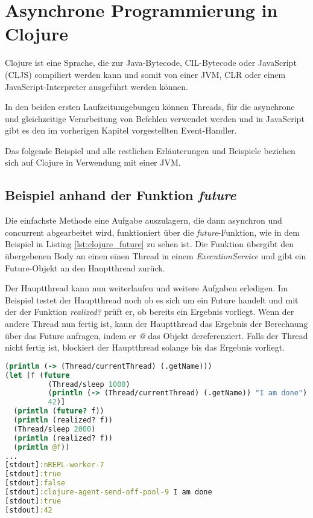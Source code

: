 \section{Asynchrone Programmierung in Clojure}

Clojure ist eine Sprache, die zur Java-Bytecode, CIL-Bytecode oder JavaScript (\acl{CLJS}) compiliert werden kann und somit von einer \ac{JVM}, \ac{CLR} oder einem JavaScript-Interpreter ausgeführt werden können.

In den beiden ersten Laufzeitumgebungen können Threads, für die asynchrone und gleichzeitige Verarbeitung von Befehlen verwendet werden und in JavaScript gibt es den im vorherigen Kapitel vorgestellten Event-Handler.

Das folgende Beispiel und alle restlichen Erläuterungen und Beispiele beziehen sich auf Clojure in Verwendung mit einer \ac{JVM}.

\subsection*{Beispiel anhand der Funktion \textit{future}}
Die einfachste Methode eine Aufgabe auszulagern, die dann asynchron und concurrent abgearbeitet wird, funktioniert über die \textit{future}-Funktion, wie in dem Beispiel in Listing \ref{lst:clojure_future} zu sehen ist. Die Funktion übergibt den übergebenen Body an einen einen Thread in einem \textit{ExecutionService} und gibt ein Future-Objekt an den Hauptthread zurück.

Der Hauptthread kann nun weiterlaufen und weitere Aufgaben erledigen. Im Beispiel testet der Hauptthread noch ob es sich um ein Future handelt und mit der der Funktion \textit{realized?} prüft er, ob bereits ein Ergebnis vorliegt. Wenn der andere Thread nun fertig ist, kann der Hauptthread das Ergebnis der Berechnung über das Future anfragen, indem er \textit{@} das Objekt dereferenziert. Falls der Thread nicht fertig ist, blockiert der Hauptthread solange bis das Ergebnis vorliegt.

\begin{lstlisting}[language=Clojure,caption=Das asynchrone Ausführen von Befehlen mit der Funktion \textit{future},label=lst:clojure_future]
(println (-> (Thread/currentThread) (.getName)))
(let [f (future
          (Thread/sleep 1000)
          (println (-> (Thread/currentThread) (.getName)) "I am done")
          42)]
  (println (future? f))
  (println (realized? f))
  (Thread/sleep 2000)
  (println (realized? f))
  (println @f))
...
[stdout]:nREPL-worker-7
[stdout]:true
[stdout]:false
[stdout]:clojure-agent-send-off-pool-9 I am done
[stdout]:true
[stdout]:42
\end{lstlisting}

